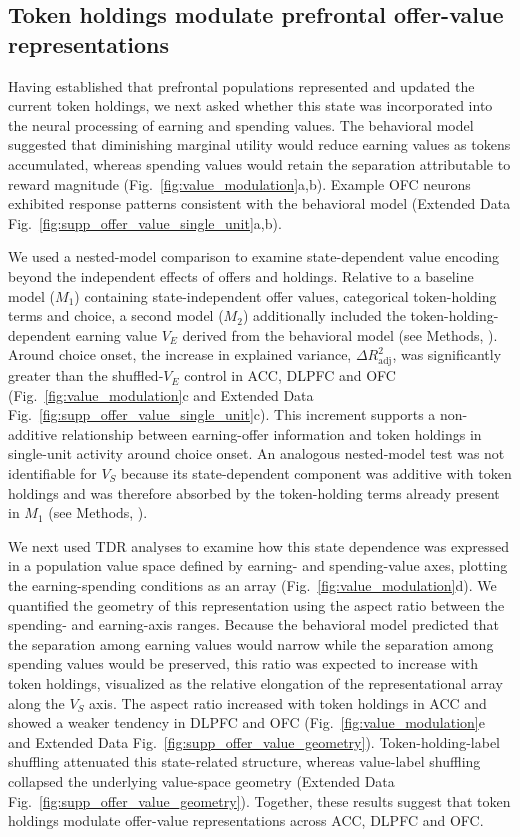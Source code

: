 \documentclass[pdflatex,sn-mathphys-num]{sn-jnl}%
\begin{document}
\subsection{Token holdings modulate prefrontal offer-value representations}
Having established that prefrontal populations represented and updated the current token holdings, we next asked whether this state was incorporated into the neural processing of earning and spending values. The behavioral model suggested that diminishing marginal utility would reduce earning values as tokens accumulated, whereas spending values would retain the separation attributable to reward magnitude (Fig.~\ref{fig:value_modulation}a,b). Example OFC neurons exhibited response patterns consistent with the behavioral model (Extended Data Fig.~\ref{fig:supp_offer_value_single_unit}a,b).

We used a nested-model comparison to examine state-dependent value encoding beyond the independent effects of offers and holdings. Relative to a baseline model ($M_1$) containing state-independent offer values, categorical token-holding terms and choice, a second model ($M_2$) additionally included the token-holding-dependent earning value $V_E$ derived from the behavioral model (see Methods, ). Around choice onset, the increase in explained variance, $\Delta R^2_{\mathrm{adj}}$, was significantly greater than the shuffled-$V_E$ control in ACC, DLPFC and OFC (Fig.~\ref{fig:value_modulation}c and Extended Data Fig.~\ref{fig:supp_offer_value_single_unit}c). This increment supports a non-additive relationship between earning-offer information and token holdings in single-unit activity around choice onset. An analogous nested-model test was not identifiable for $V_S$ because its state-dependent component was additive with token holdings and was therefore absorbed by the token-holding terms already present in $M_1$ (see Methods, ).

We next used TDR analyses to examine how this state dependence was expressed in a population value space defined by earning- and spending-value axes, plotting the earning-spending conditions as an array (Fig.~\ref{fig:value_modulation}d). We quantified the geometry of this representation using the aspect ratio between the spending- and earning-axis ranges. Because the behavioral model predicted that the separation among earning values would narrow while the separation among spending values would be preserved, this ratio was expected to increase with token holdings, visualized as the relative elongation of the representational array along the $V_S$ axis. The aspect ratio increased with token holdings in ACC and showed a weaker tendency in DLPFC and OFC (Fig.~\ref{fig:value_modulation}e and Extended Data Fig.~\ref{fig:supp_offer_value_geometry}). Token-holding-label shuffling attenuated this state-related structure, whereas value-label shuffling collapsed the underlying value-space geometry (Extended Data Fig.~\ref{fig:supp_offer_value_geometry}). Together, these results suggest that token holdings modulate offer-value representations across ACC, DLPFC and OFC.
\end{document}
